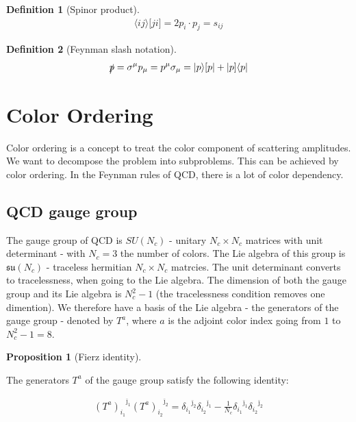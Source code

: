 \documentclass{article}
\theoremstyle{definition}
\newtheorem{definition}{Definition}[section]
\newtheorem{prop}[theorem]{Proposition}
\numberwithin{equation}{section}
\begin{document}
\begin{definition}[Spinor product]

\begin{align}
     \langle ij \rangle \lbrack ji \rbrack = 2 p_i \cdot p_j = s_{ij} \label{eq:ij}
\end{align}

\end{definition}

\begin{definition}[Feynman slash notation]

\begin{align}
     \slashed{p} = \sigma^{\mu} p_{\mu} = p^{\mu} \sigma_{\mu} = | p \rangle \lbrack p | + | p \rbrack \langle p | \label{eq:slash}
\end{align}

\end{definition}

\section{Color Ordering}

Color ordering is a concept to treat the color component of scattering amplitudes. We want to decompose the problem into subproblems. This can be achieved by color ordering. In the Feynman rules of QCD, there is a lot of color dependency.

\subsection{QCD gauge group}

The gauge group of QCD is $SU(N_c)$ - unitary $N_c \times N_c$ matrices with unit determinant - with $N_c = 3$ the number of colors. The Lie algebra of this group is $\mathfrak{su}(N_c)$ - traceless hermitian $N_c \times N_c$ matrcies. The unit determinant converts to tracelessness, when going to the Lie algebra. The dimension of both the gauge group and its Lie algebra is $N_c^2 - 1$ (the tracelessness condition removes one dimention). We therefore have a basis of the Lie algebra - the generators of the gauge group - denoted by $T^a$, where $a$ is the adjoint color index going from $1$ to $N_c^2 - 1 = 8$.

\begin{prop}[Fierz identity]
\label{prop:fierz}

The generators $T^a$ of the gauge group satisfy the following identity:

\begin{align}
    {\left( T^a \right)_{i_1}}^{\bar{\jmath}_1} {\left( T^a \right)_{i_2}}^{\bar{\jmath}_2} = {\delta_{i_1}}^{\bar{\jmath}_2} {\delta_{i_2}}^{\bar{\jmath}_1} - \frac{1}{N_c} {\delta_{i_1}}^{\bar{\jmath}_1} {\delta_{i_2}}^{\bar{\jmath}_2} \label{eq:fierz2} 
\end{align}

\end{prop}
\end{document}
